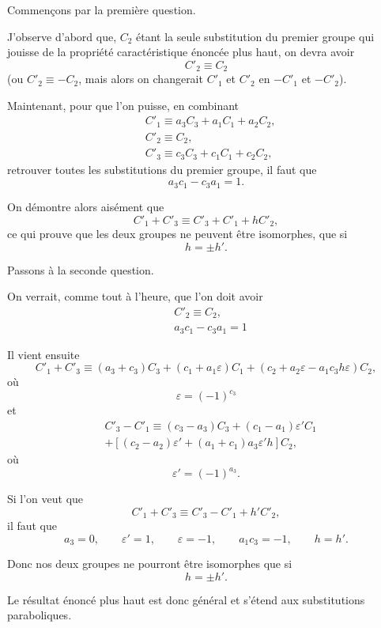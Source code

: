 \documentclass{article}
\begin{document}
Commençons par la première question.

J'observe d'abord que, $C_{2}$ étant la seule substitution du premier groupe qui jouisse de la propriété caractéristique énoncée plus haut, on devra avoir
\[ C'_{2} \equiv C_{2} \]
(ou $C'_{2} \equiv -C_{2}$, mais alors on changerait $C'_{1}$ et $C'_{2}$ en $-C'_{1}$ et $-C'_{2}$).

Maintenant, pour que l'on puisse, en combinant
\[ \begin{aligned} &C'_{1} \equiv a_{3}C_{3} + a_{1}C_{1} + a_{2}C_{2},\\ &C'_{2} \equiv C_{2},\\ &C'_{3} \equiv c_{3}C_{3} + c_{1}C_{1} + c_{2}C_{2}, \end{aligned} \]
retrouver toutes les substitutions du premier groupe, il faut que
\[ a_{3}c_{1} - c_{3}a_{1} = 1. \]

On démontre alors aisément que
\[ C'_{1} + C'_{3} \equiv C'_{3} + C'_{1} + hC'_{2}, \]
ce qui prouve que les deux groupes ne peuvent être isomorphes, que si
\[ h = \pm h'. \]

Passons à la seconde question.

On verrait, comme tout à l'heure, que l'on doit avoir
\[ \begin{aligned} &C'_{2} \equiv C_{2},\\ &a_{3}c_{1} - c_{3}a_{1} = 1 \end{aligned} \]

Il vient ensuite
\[ C'_{1} + C'_{3} \equiv (a_{3} + c_{3})C_{3} + (c_{1} + a_{1}\varepsilon)C_{1} + (c_{2} + a_{2}\varepsilon - a_{1}c_{3}h\varepsilon)C_{2}, \]
où
\[ \varepsilon = (-1)^{c_{3}} \]
et
\[ \begin{aligned} &C'_{3} - C'_{1} \equiv (c_{3} - a_{3})C_{3} + (c_{1} - a_{1})\varepsilon'C_{1}\\ &+ [(c_{2} - a_{2})\varepsilon' + (a_{1} + c_{1})a_{3}\varepsilon'h]C_{2}, \end{aligned} \]
où
\[ \varepsilon' = (-1)^{a_{3}}. \]

Si l'on veut que
\[ C'_{1} + C'_{3} \equiv C'_{3} - C'_{1} + h'C'_{2}, \] 
il faut que
\[ a_{3} = 0, \qquad \varepsilon' = 1, \qquad \varepsilon = -1, \qquad a_{1}c_{3} = -1, \qquad h = h'. \]

Donc nos deux groupes ne pourront être isomorphes que si
\[ h = \pm h'. \]

Le résultat énoncé plus haut est donc général et s'étend aux substitutions paraboliques.
\end{document}
